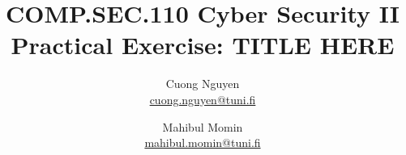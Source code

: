 \documentclass{article}
\title{COMP.SEC.110 Cyber Security II
    \large Practical Exercise: TITLE HERE\!
}
\author{Cuong Nguyen\\ \href{mailto:cuong.nguyen@tuni.fi}{cuong.nguyen@tuni.fi} 
        \and Mahibul Momin\\ \href{mailto:mahibul.momin@tuni.fi}{mahibul.momin@tuni.fi}
}
\begin{document}
    
\maketitle
\tableofcontents
\newpage

\listoffigures
\newpage

% 
% 

\printbibliography{}
\end{document}
